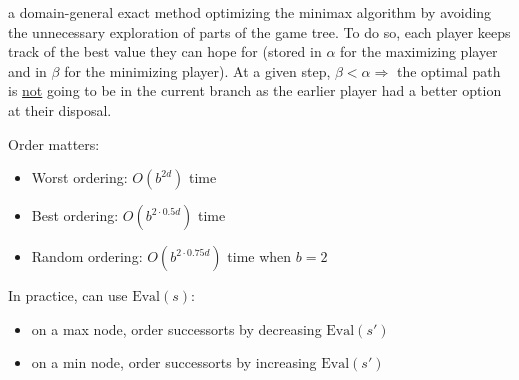  a domain-general exact method optimizing the minimax
algorithm by avoiding the unnecessary exploration of parts of the game tree. To
do so, each player keeps track of the best value they can hope for (stored in
$\alpha$ for the maximizing player and in $\beta$ for the minimizing player). At
a given step, $\beta < \alpha \Rightarrow$ the optimal path is \underline{not}
going to be in the current branch as the earlier player had a better option at
their disposal.

Order matters:
\begin{itemize}
    \item Worst ordering: $O(b^{2d})$ time
    \item Best ordering: $O(b^{2\cdot0.5d})$ time
    \item Random ordering: $O(b^{2\cdot0.75d})$ time when $b = 2$
\end{itemize}
In practice, can use $\text{Eval}(s)$:\begin{itemize}
    \item on a max node, order successorts by decreasing $\text{Eval}(s')$
    \item on a min node, order successorts by increasing $\text{Eval}(s')$
\end{itemize}
